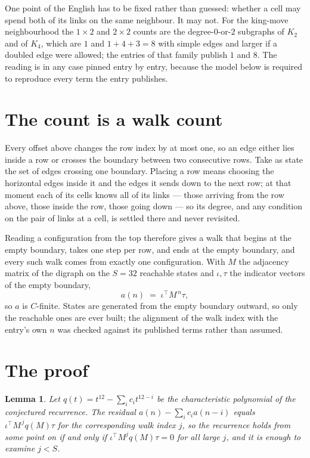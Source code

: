 \documentclass[11pt,a4paper]{article}
\theoremstyle{plain}
\newtheorem{lemma}[theorem]{Lemma}
\theoremstyle{definition}
\begin{document}
One point of the English has to be fixed rather than guessed: whether a cell may spend both of
its links on the same neighbour. It may not. For the king-move neighbourhood the $1\times2$
and $2\times2$ counts are the degree-$0$-or-$2$ subgraphs of $K_2$ and of $K_4$, which are $1$
and $1+4+3=8$ with simple edges and larger if a doubled edge were allowed; the entries of that
family publish $1$ and $8$. The reading is in any case pinned entry by entry, because the
model below is required to reproduce every term the entry publishes.


\section{The count is a walk count}

Every offset above changes the row index by at most one, so an edge either lies inside a row
or crosses the boundary between two consecutive rows. Take as state the set of edges crossing
one boundary. Placing a row means choosing the horizontal edges inside it and the edges it
sends down to the next row; at that moment each of its cells knows all of its links --- those
arriving from the row above, those inside the row, those going down --- so its degree, and any
condition on the pair of links at a cell, is settled there and never revisited.

Reading a configuration from the top therefore gives a walk that begins at the empty boundary,
takes one step per row, and ends at the empty boundary, and every such walk comes from exactly
one configuration. With $M$ the adjacency matrix of the digraph on the $S=32$ reachable
states and $\iota,\tau$ the indicator vectors of the empty boundary,
\[
a(n)\;=\;\iota^{\!\top}M^{\,n}\tau ,
\]
so $a$ is $C$-finite. States are generated from the empty boundary outward, so only the
reachable ones are ever built; the alignment of the walk index with the entry's own $n$ was
checked against its published terms rather than assumed.

\section{The proof}

\begin{lemma}\label{lem:crit}
Let $q(t)=t^{12}-\sum_i c_it^{12-i}$ be the characteristic polynomial of the
conjectured recurrence. The residual $a(n)-\sum_ic_ia(n-i)$ equals
$\iota^{\!\top}M^{\,j}q(M)\tau$ for the corresponding walk index $j$, so the recurrence
holds from some point on if and only if $\iota^{\!\top}M^{j}q(M)\tau=0$ for all large $j$,
and it is enough to examine $j<S$.
\end{lemma}
\end{document}
